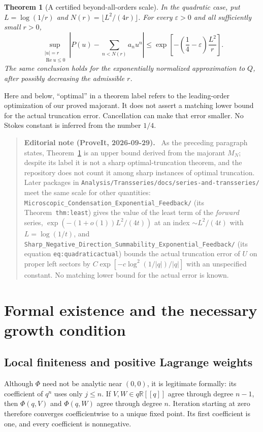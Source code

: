 \documentclass[11pt,a4paper]{article}
\numberwithin{equation}{section}
\newtheorem{theorem}{Theorem}[section]
\theoremstyle{definition}
\theoremstyle{remark}
\newcommand{\R}{\mathbb R}
\newcommand{\Ree}{\operatorname{Re}}
\newenvironment{ednote}{\par\smallskip\begin{quote}\small\raggedright\textbf{Editorial note (ProveIt, 2026-09-29).}\ }{\end{quote}\smallskip}
\begin{document}
\begin{theorem}[A certified beyond-all-orders scale]
\label{thm:optimal}
In the quadratic case, put $L=\log(1/r)$ and
$N(r)=\lfloor L^2/(4r)\rfloor$.  For every $\varepsilon>0$ and all
sufficiently small $r>0$,
\begin{equation}
 \sup_{\substack{|u|=r\\\Ree u\le0}}
 \left|P(u)-\sum_{n<N(r)}a_nu^n\right|
 \le \exp\!\left[-\left(\frac14-\varepsilon\right)
                         \frac{L^2}{r}\right].
 \label{eq:optimal}
\end{equation}
The same conclusion holds for the exponentially normalized approximation
to $Q$, after possibly decreasing the admissible $r$.
\end{theorem}

Here and below, ``optimal'' in a theorem label refers to the leading-order
optimization of our proved majorant.  It does not assert a matching lower
bound for the actual truncation error.  Cancellation can make that error
smaller.  No Stokes constant is inferred from the number $1/4$.
\begin{ednote}
As the preceding paragraph states, Theorem~\ref{thm:optimal} is an upper
bound derived from the majorant $M_N$; despite its label it is not a sharp
optimal-truncation theorem, and the repository does not count it among
sharp instances of optimal truncation. Later packages in
\nolinkurl{Analysis/Transseries/docs/series-and-transseries/} meet the same
scale for other quantities:
\nolinkurl{Microscopic_Condensation_Exponential_Feedback/} (its
Theorem~\texttt{thm:least}) gives the value of the least term of the \emph{forward}
series, $\exp(-(1+o(1))L^2/(4t))$ at an index $\sim L^2/(4t)$ with
$L=\log(1/t)$, and
\nolinkurl{Sharp_Negative_Direction_Summability_Exponential_Feedback/}
(its equation \texttt{eq:quadraticactual}) bounds the actual truncation error of
$U$ on proper left sectors by $C\exp[-c\log^2(1/|q|)/|q|]$ with an
unspecified constant. No matching lower bound for the actual error is
known.
\end{ednote}

\section{Formal existence and the necessary growth condition}
\label{sec:formal}

\subsection{Local finiteness and positive Lagrange weights}
Although $\Phi$ need not be analytic near $(0,0)$, it is legitimate
formally: its coefficient of $q^n$ uses only $j\le n$.  If
$V,W\in q\R[[q]]$ agree through degree $n-1$, then
$\Phi(q,V)$ and $\Phi(q,W)$ agree through degree $n$.  Iteration starting
at zero therefore converges coefficientwise to a unique fixed point.
Its first coefficient is one, and every coefficient is nonnegative.
\end{document}

